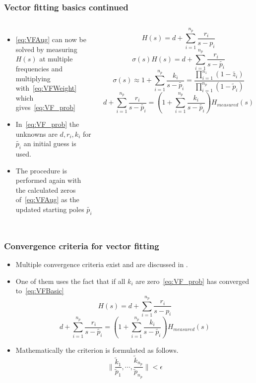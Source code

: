 \begin{frame}
	\setcounter{equation}{2}
	\frametitle{Vector fitting basics continued}
	\begin{columns}[c]
			\begin{itemize}
				\item<1-> \eqref{eq:VFAug} can now be solved by measuring $H(s)$ at multiple frequencies and multiplying with~\eqref{eq:VFWeight} which gives~\eqref{eq:VF_prob}
				\item<2-> In~\eqref{eq:VF_prob} the unknowns are $d,r_i,k_i$ for $\tilde{p_i}$ an initial guess is used.
				\item<3-> The procedure is performed again with the calculated zeros of~\eqref{eq:VFAug} as the updated starting poles $\tilde{p_i}$
			\end{itemize}
				\begin{equation}
					\label{eq:VFBasic}
					H(s) = d + \sum^{n_p}_{i=1}\frac{r_i}{s-p_i}
				\end{equation}
				\begin{equation}
					\label{eq:VFAug}
					\sigma(s)H(s) = d + \sum^{n_p}_{i=1}\frac{r_i}{s-\tilde{p_i}}
				\end{equation}
						\begin{equation}
							\label{eq:VFWeight}
							\sigma(s) \approx 1+\sum^{n_p}_{i=1}\frac{k_i}{s-\tilde{p_i}} = \frac{\prod_{i=1}^{n_z}(1-\tilde{z_i})}{\prod_{i=1}^{n_p}(1-\tilde{p}_i)}
						\end{equation}
				\begin{equation}\label{eq:VF_prob}
				d + \sum^{n_p}_{i=1}\frac{r_i}{s-\tilde{p_i}} =(1+\sum^{n_p}_{i=1}\frac{k_i}{s-\tilde{p_i}})H_{measured}(s)
				\end{equation}
	\end{columns}
\end{frame}
\begin{frame}
	\frametitle{Convergence criteria for vector fitting}
		\begin{itemize}
			\item<1-> Multiple convergence criteria exist and are discussed in \cite{stefano_grivet-talocia_passive_2016}.
			\item<2-> One of them uses the fact that if all $k_i$ are zero~\eqref{eq:VF_prob} has converged to~\eqref{eq:VFBasic}
\setcounter{equation}{2}
				\begin{equation}
					\label{eq:VFBasic}
					H(s) = d + \sum^{n_p}_{i=1}\frac{r_i}{s-p_i}
				\end{equation}
\setcounter{equation}{5}
				\begin{equation}\label{eq:VF_prob}
				d + \sum^{n_p}_{i=1}\frac{r_i}{s-\tilde{p_i}} =(1+\sum^{n_p}_{i=1}\frac{k_i}{s-\tilde{p_i}})H_{measured}(s)
				\end{equation}
		\item<3-> Mathematically the criterion is formulated as follows.
\begin{equation}
    \label{eq:VFConvergence}
    \|\frac{\tilde{k}_1}{\tilde{p}_1},\cdots,\frac{\tilde{k}_{n_p}}{\tilde{p}_{n_p}}\| < \epsilon
\end{equation}
	\end{itemize}
\end{frame}
